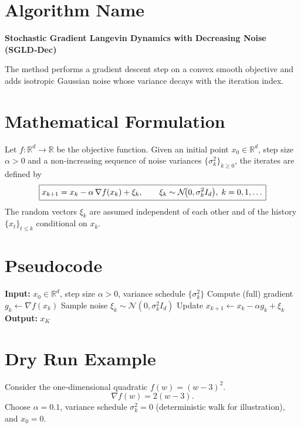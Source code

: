 \documentclass[11pt]{article}
\newcommand{\RR}{\mathbb{R}}
\begin{document}
\section*{Algorithm Name}
\textbf{Stochastic Gradient Langevin Dynamics with Decreasing Noise (SGLD‑Dec)}  

The method performs a gradient descent step on a convex smooth objective and adds isotropic Gaussian noise whose variance decays with the iteration index.

\section*{Mathematical Formulation}
Let $f:\RR^{d}\rightarrow\RR$ be the objective function.  
Given an initial point $x_{0}\in\RR^{d}$, step size $\alpha>0$ and a non‑increasing sequence of noise variances $\{\sigma_{k}^{2}\}_{k\ge 0}$, the iterates are defined by  
\begin{equation}
\boxed{%
x_{k+1}=x_{k}-\alpha\,\nabla f(x_{k})+\xi_{k},\qquad 
\xi_{k}\sim\mathcal N\!\big(0,\sigma_{k}^{2}I_{d}\big),\;k=0,1,\dots
}
\label{eq:update}
\end{equation}
The random vectors $\xi_{k}$ are assumed independent of each other and of the history $\{x_{t}\}_{t\le k}$ conditional on $x_{k}$.

\section*{Pseudocode}
\begin{algorithm}[H]
\caption{SGLD‑Dec}
\begin{algorithmic}[1]
\State \textbf{Input:} $x_{0}\in\RR^{d}$, step size $\alpha>0$, variance schedule $\{\sigma_{k}^{2}\}$
    \State Compute (full) gradient $g_{k}\gets\nabla f(x_{k})$
    \State Sample noise $\xi_{k}\sim\mathcal N(0,\sigma_{k}^{2}I_{d})$
    \State Update $x_{k+1}\gets x_{k}-\alpha g_{k}+\xi_{k}$ \label{alg:update}
\EndFor
\State \textbf{Output:} $x_{K}$
\end{algorithmic}
\end{algorithm}

\section*{Dry Run Example}
Consider the one‑dimensional quadratic $f(w)=(w-3)^{2}$.  
\[
\nabla f(w)=2(w-3).
\]
Choose $\alpha=0.1$, variance schedule $\sigma_{k}^{2}=0$ (deterministic walk for illustration), and $x_{0}=0$.
\end{document}
